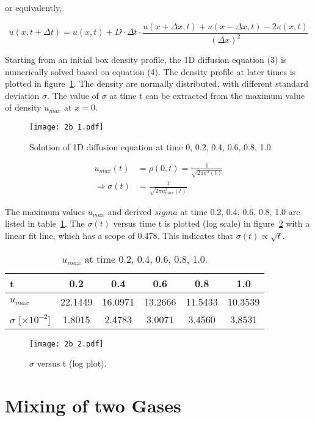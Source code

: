\documentclass{article}
\begin{document}
or equivalently,

\begin{equation}
u(x,t+\Delta t) = u(x,t) + D \cdot \Delta t \cdot \frac{u(x+\Delta x,t)+u(x-\Delta x,t)-2u(x,t)}{(\Delta x)^2}
\end{equation}

Starting from an initial box density profile, the 1D diffusion equation (3) is numerically solved based on equation (4). The density profile at later times is plotted in figure~\ref{diffusion}. The density are normally distributed, with different standard deviation $\sigma$. The value of $\sigma$ at time t can be extracted from the maximum value of density $u_{max}$ at $x=0$.

\begin{figure}
\centering
\texttt{[image: 2b\_1.pdf]}
\caption{Solution of 1D diffusion equation at time 0, 0.2, 0.4, 0.6, 0.8, 1.0.}
\label{diffusion}
\end{figure}

\begin{align*}
u_{max} (t) & = \rho(0,t) = \frac{1}{\sqrt{2\pi \sigma^2 (t)}} \\
\Rightarrow \sigma(t) & = \frac{1}{\sqrt{2\pi u_{max}^2 (t)}}
\end{align*}

The maximum values $u_{max}$ and derived $sigma$ at time 0.2, 0.4, 0.6, 0.8, 1.0 are listed in table~\ref{umax}. The $\sigma (t)$ versus time t is plotted (log scale) in figure~\ref{sigma} with a linear fit line, which has a scope of 0.478. This indicates that $\sigma(t) \propto \sqrt{t}$.

\begin{table}[!ht]
\begin{center}
\caption{$u_{max}$ at time 0.2, 0.4, 0.6, 0.8, 1.0.}
\begin{tabular}{ l | c | c | c | c | c }
\hline
t & 0.2 & 0.4 & 0.6 & 0.8 & 1.0 \\ \hline
$u_{max}$ & 22.1449 & 16.0971 & 13.2666 & 11.5433 & 10.3539 \\ \hline
$\sigma$ [$\times 10^{-2}$] & 1.8015 & 2.4783 & 3.0071 & 3.4560 & 3.8531 \\ \hline
\end{tabular}
\end{center}
\label{umax}
\end{table}

\begin{figure}
\centering
\texttt{[image: 2b\_2.pdf]}
\caption{$\sigma$ versus t (log plot).}
\label{sigma}
\end{figure}

\section{Mixing of two Gases}
\end{document}
